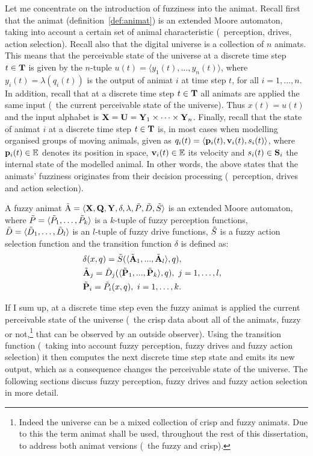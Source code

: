 Let me concentrate on the introduction of fuzziness into the animat. Recall first that the animat (definition~\ref{def:animat}) is an extended Moore automaton, taking into account a certain set of animal characteristic (\ie\ perception, drives, action selection). Recall also that the digital universe is a collection of $n$ animats. This means that the perceivable state of the universe at a discrete time step $t \in {\ensuremath{\mathbf{T}}}$ is given by the $n$-tuple $u(t)=\langle y_1(t),\ldots,y_n(t)\rangle$, where $y_i(t)=\lambda(q_i(t))$ is the output of animat $i$ at time step $t$, for all $i=1,\ldots,n$. In addition, recall that at a discrete time step $t \in {\ensuremath{\mathbf{T}}}$ all animats are applied the same input (\ie\ the current perceivable state of the universe). Thus $x(t)=u(t)$ and the input alphabet is ${\mathbf{X}}={\mathbf{U}}={\mathbf{Y}}_1 \times \cdots \times {\ensuremath{\mathbf{Y}}}_n$. Finally, recall that the state of animat $i$ at a discrete time step $t \in {\ensuremath{\mathbf{T}}}$ is, in most cases when modelling organised groups of moving animals, given as $q_i(t)=\langle {\ensuremath{\mathbf{p}}}_i(t), {\mathbf{v}}_i(t), s_i(t) \rangle$, where ${\mathbf{p}}_i(t) \in \mathbb{E}$ denotes its position in space, ${\mathbf{v}}_i(t) \in \mathbb{E}$ its velocity and $s_i(t) \in {\ensuremath{\mathbf{S}}}_i$ the internal state of the modelled animal. In other words, the above states that the animats' fuzziness originates from their decision processing (\ie\ perception, drives and action selection).

\begin{defn}
\label{def:fuzzyAnimat}
A fuzzy animat ${\tilde{\mathrm{A}}}=\langle{\ensuremath{\mathbf{X}}},{\mathbf{Q}},{\mathbf{Y}},\delta,\lambda,{\tilde{P}},{\tilde{D}},{\tilde{S}}\rangle$ is an extended Moore automaton, where ${\tilde{P}}=\langle{\ensuremath{\tilde{P}}}_1,\ldots,{\tilde{P}}_k\rangle$ is a $k$-tuple of fuzzy perception functions, ${\tilde{D}}=\langle{\ensuremath{\tilde{D}}}_1,\ldots,{\tilde{D}}_l\rangle$ is an $l$-tuple of fuzzy drive functions, ${\tilde{S}}$ is a fuzzy action selection function and the transition function $\delta$ is defined as:
\begin{eqnarray}
  & \delta(x,q) = {\tilde{S}}(\langle{\ensuremath{\tilde{{\mathbf{A}}}}}_1,...,{\tilde{{\mathbf{A}}}}_l\rangle,q), & \label{eq:fuzzyAnimat:delta}\\
  & {\tilde{{\mathbf{A}}}}_j = {\tilde{D}}_j(\langle{\ensuremath{\tilde{{\mathbf{P}}}}}_1,...,{\tilde{{\mathbf{P}}}}_k\rangle,q),\ j=1,\ldots,l, & \\
  & {\tilde{{\mathbf{P}}}}_i = {\tilde{P}}_i(x,q),\ i=1,\ldots,k. & \label{eq:fuzzyAnimat:Pi}
\end{eqnarray}
\end{defn}

If I sum up, at a discrete time step even the fuzzy animat is applied the current perceivable state of the universe (\ie\ the crisp data about all of the animats, fuzzy or not,\footnote{Indeed the universe can be a mixed collection of crisp and fuzzy animats. Due to this the term animat shall be used, throughout the rest of this dissertation, to address both animat versions (\ie\ the fuzzy and crisp).} that can be observed by an outside observer). Using the transition function (\ie\ taking into account fuzzy perception, fuzzy drives and fuzzy action selection) it then computes the next discrete time step state and emits its new output, which as a consequence changes the perceivable state of the universe. The following sections discuss fuzzy perception, fuzzy drives and fuzzy action selection in more detail.

